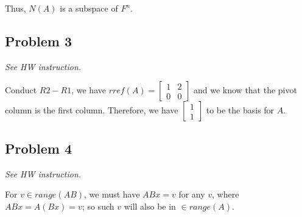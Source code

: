 \documentclass[11pt]{article}
\providecommand{\qbm}[1]{\begin{bmatrix} #1 \end{bmatrix}}
\begin{document}
Thus, $N(A)$ is a subspace of $F^n$.

\subsection*{Problem 3}
\textit{See HW instruction.}\newline

Conduct $R2 - R1$, we have $rref(A) = \qbm{1 & 2 \\ 0 & 0}$ and we know that the pivot column is the first column. Therefore, we have $\qbm{1 \\ 1}$ to be the basis for $A$.

\subsection*{Problem 4}
\textit{See HW instruction.}\newline

For $v \in range(AB)$, we must have $ABx = v$ for any $v$, where $ABx = A(Bx) = v$; so such $v$ will also be in $\in range(A)$.
\end{document}
